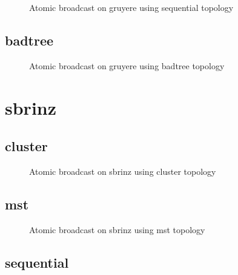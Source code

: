 \begin{figure}[h!]
\begin{tikzpicture}[transform shape,scale=.25]

\end{tikzpicture}

\caption{Atomic broadcast on gruyere using sequential topology}
\label{fig:ab_gruyere_sequential}
\end{figure}
\clearpage\subsection{badtree}

\begin{figure}[h!]
\begin{tikzpicture}[transform shape,scale=.25]

\end{tikzpicture}

\caption{Atomic broadcast on gruyere using badtree topology}
\label{fig:ab_gruyere_badtree}
\end{figure}
\clearpage\newpage\clearpage\section{sbrinz}

\subsection{cluster}

\begin{figure}[h!]
\begin{tikzpicture}[transform shape,scale=.25]

\end{tikzpicture}

\caption{Atomic broadcast on sbrinz using cluster topology}
\label{fig:ab_sbrinz_cluster}
\end{figure}
\clearpage\subsection{mst}

\begin{figure}[h!]
\begin{tikzpicture}[transform shape,scale=.25]

\end{tikzpicture}

\caption{Atomic broadcast on sbrinz using mst topology}
\label{fig:ab_sbrinz_mst}
\end{figure}
\clearpage\subsection{sequential}

